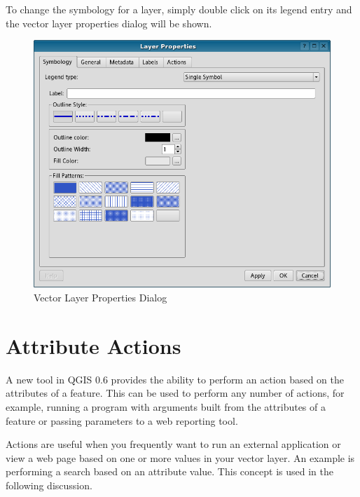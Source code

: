 To change the symbology for a layer, simply double click on its legend entry and
the vector layer properties dialog will be shown.

\begin{figure}[h]
   \begin{center}
   \caption{Vector Layer Properties Dialog}\label{fig:vector_symbology}\smallskip
   \includegraphics[scale=.5]{qgis_user_guide_images/vectorLayerSymbology}  
\end{center}  
\end{figure}
\section{Attribute Actions}
A new tool in QGIS 0.6 provides the ability to perform an action based on the
attributes of a feature. This can be used to perform any number of actions, for
example, running a program with arguments built from the attributes of a
feature or passing parameters to a web reporting tool.

Actions are useful when you frequently want to run an external application or
view a web page based on one or more values in your vector layer. An example is
performing a search based on an attribute value. This concept is used in the
following discussion.

